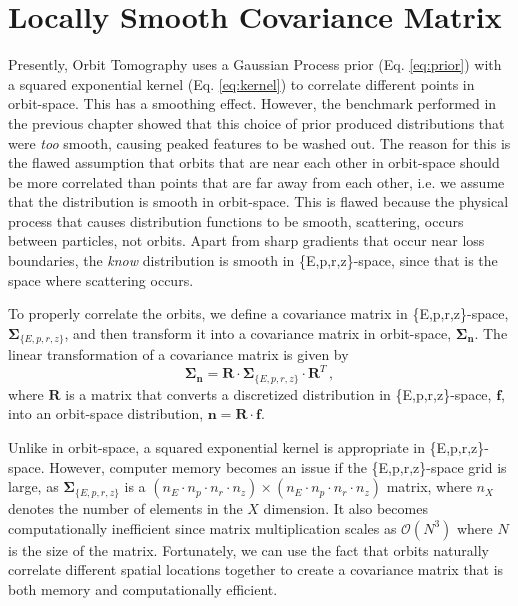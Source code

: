 \section{Locally Smooth Covariance Matrix}
Presently, Orbit Tomography uses a Gaussian Process prior (Eq. \ref{eq:prior}) with a squared exponential kernel (Eq. \ref{eq:kernel}) to correlate different points in orbit-space. This has a smoothing effect. However, the benchmark performed in the previous chapter showed that this choice of prior produced distributions that were \emph{too} smooth, causing peaked features to be washed out. The reason for this is the flawed assumption that orbits that are near each other in orbit-space should be more correlated than points that are far away from each other, i.e. we assume that the distribution is smooth in orbit-space. This is flawed because the physical process that causes distribution functions to be smooth, scattering, occurs between particles, not orbits. Apart from sharp gradients that occur near loss boundaries, the \emph{know} distribution is smooth in \{E,p,r,z\}-space, since that is the space where scattering occurs. 

To properly correlate the orbits, we define a covariance matrix in \{E,p,r,z\}-space, $\mathbf{\Sigma}_{\{E,p,r,z\}}$, and then transform it into a covariance matrix in orbit-space, $\mathbf{\Sigma_n}$.
The linear transformation of a covariance matrix is given by
\begin{equation}\label{eq:transform_covariance}
    \mathbf{\Sigma_n} = \mathbf{R} \cdot \mathbf{\Sigma}_{\{E,p,r,z\}} \cdot \mathbf{R}^T\,,
\end{equation}
where $\mathbf{R}$ is a matrix that converts a discretized distribution in \{E,p,r,z\}-space, $\mathbf{f}$, into an orbit-space distribution, $\mathbf{n} = \mathbf{R} \cdot \mathbf{f}$.

Unlike in orbit-space, a squared exponential kernel is appropriate in \{E,p,r,z\}-space. However, computer memory becomes an issue if the \{E,p,r,z\}-space grid is large, as $\mathbf{\Sigma}_{\{E,p,r,z\}}$ is a $(n_E \cdot n_p \cdot n_r \cdot n_z) \times (n_E \cdot n_p \cdot n_r \cdot n_z)$ matrix, where $n_X$ denotes the number of elements in the $X$ dimension. It also becomes computationally inefficient since matrix multiplication scales as $\mathcal{O}(N^3)$ where $N$ is the size of the matrix. 
Fortunately, we can use the fact that orbits naturally correlate different spatial locations together to create a covariance matrix that is both memory and computationally efficient.


